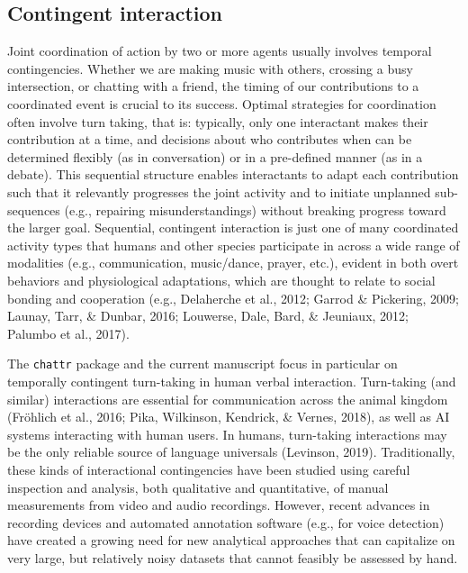 \documentclass[10pt, letterpaper]{article}
\begin{document}
\hypertarget{contingent-interaction}{%
\subsection{Contingent interaction}\label{contingent-interaction}}

Joint coordination of action by two or more agents usually involves
temporal contingencies. Whether we are making music with others,
crossing a busy intersection, or chatting with a friend, the timing of
our contributions to a coordinated event is crucial to its success.
Optimal strategies for coordination often involve turn taking, that is:
typically, only one interactant makes their contribution at a time, and
decisions about who contributes when can be determined flexibly (as in
conversation) or in a pre-defined manner (as in a debate). This
sequential structure enables interactants to adapt each contribution
such that it relevantly progresses the joint activity and to initiate
unplanned sub-sequences (e.g., repairing misunderstandings) without
breaking progress toward the larger goal. Sequential, contingent
interaction is just one of many coordinated activity types that humans
and other species participate in across a wide range of modalities
(e.g., communication, music/dance, prayer, etc.), evident in both overt
behaviors and physiological adaptations, which are thought to relate to
social bonding and cooperation (e.g., Delaherche et al., 2012; Garrod \&
Pickering, 2009; Launay, Tarr, \& Dunbar, 2016; Louwerse, Dale, Bard, \&
Jeuniaux, 2012; Palumbo et al., 2017).

The \texttt{chattr} package and the current manuscript focus in
particular on temporally contingent turn-taking in human verbal
interaction. Turn-taking (and similar) interactions are essential for
communication across the animal kingdom (Fröhlich et al., 2016; Pika,
Wilkinson, Kendrick, \& Vernes, 2018), as well as AI systems interacting
with human users. In humans, turn-taking interactions may be the only
reliable source of language universals (Levinson, 2019). Traditionally,
these kinds of interactional contingencies have been studied using
careful inspection and analysis, both qualitative and quantitative, of
manual measurements from video and audio recordings. However, recent
advances in recording devices and automated annotation software (e.g.,
for voice detection) have created a growing need for new analytical
approaches that can capitalize on very large, but relatively noisy
datasets that cannot feasibly be assessed by hand.
\end{document}
